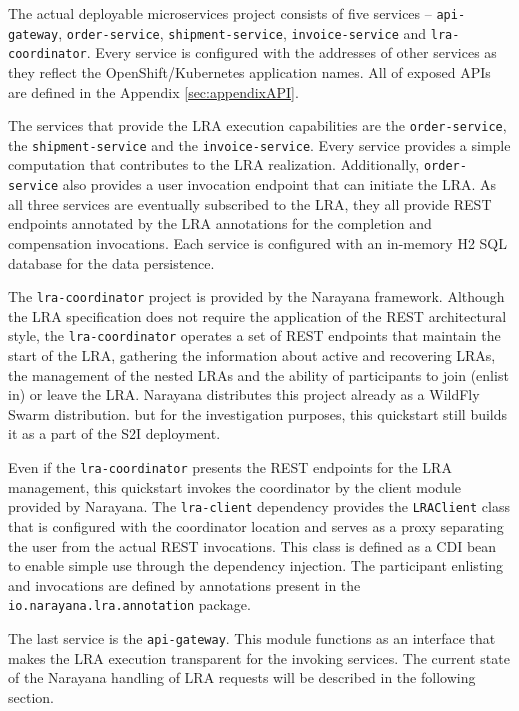 \documentclass[oneside,
  digital, %
  table,   %
  nolof,     %
  nolot,     %
]{fithesis3}
\begin{document}
The actual deployable microservices project consists of five services -- \texttt{api-gateway}, \texttt{order-service}, \texttt{shipment-service}, \texttt{invoice-service} and \texttt{lra-coordinator}. Every service is configured with the addresses of other services as they reflect the OpenShift/Kubernetes application names. All of exposed APIs are defined in the Appendix \ref{sec:appendixAPI}.

The services that provide the LRA execution capabilities are the \texttt{order-service}, the \texttt{shipment-service} and the \texttt{invoice-service}. Every service provides a simple computation that contributes to the LRA realization. Additionally, \texttt{order-service} also provides a user invocation endpoint that can initiate the LRA. As all three services are eventually subscribed to the LRA, they all provide REST endpoints annotated by the LRA annotations for the completion and compensation invocations. Each service is configured with an in-memory H2 SQL database for the data persistence.

The \texttt{lra-coordinator} project is provided by the Narayana framework. Although the LRA specification does not require the application of the REST architectural style, the \texttt{lra-coordinator} operates a set of REST endpoints that maintain the start of the LRA, gathering the information about active and recovering LRAs, the management of the nested LRAs and the ability of participants to join (enlist in) or leave the LRA. Narayana distributes this project already as a WildFly Swarm distribution. but for the investigation purposes, this quickstart still builds it as a part of the S2I deployment.

Even if the \texttt{lra-coordinator} presents the REST endpoints for the LRA management, this quickstart invokes the coordinator by the client module provided by Narayana. The \texttt{lra-client} dependency provides the \texttt{LRAClient} class that is configured with the coordinator location and serves as a proxy separating the user from the actual REST invocations. This class is defined as a CDI bean to enable simple use through the dependency injection. The participant enlisting and invocations are defined by annotations present in the \texttt{io.narayana.lra.annotation} package.

The last service is the \texttt{api-gateway}. This module functions as an interface that makes the LRA execution transparent for the invoking services. The current state of the Narayana handling of LRA requests will be described in the following section.
\end{document}
